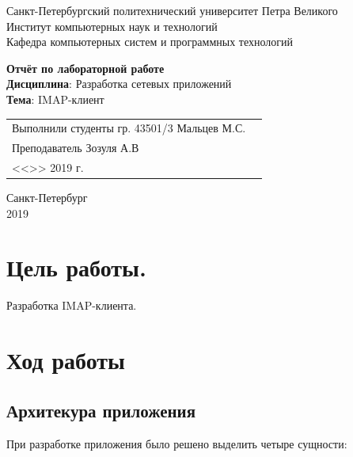 \documentclass[a4paper,14pt]{extarticle}
\begin{document}
\begin{titlepage}
\centering
Санкт-Петербургский политехнический университет Петра Великого \\
Институт компьютерных наук и технологий \\
Кафедра компьютерных систем и программных технологий \\
\vspace{5.5cm}

{\centering \textbf{Отчёт по лабораторной работе} \\ 
\vspace{0.15cm}
\textbf{Дисциплина}: Разработка сетевых приложений \\
\vspace{0.15cm}
\textbf{Тема}: IMAP-клиент } \\

\vspace{5.5cm}

\begin{table}[H]
\begin{tabular}{p{\textwidth}@{}r}
{Выполнили студенты гр. 43501/3} \hfill 
\vspace{0.2cm}
Мальцев М.С. \\ \hfill
\vspace{0.2cm}

Преподаватель \hfill 
\vspace{0.2cm}
Зозуля А.В \\ \hfill 
\vspace{0.2cm}

{} \hfill { <<\underline{\hspace{0.08\textwidth}}>> \underline{\hspace{0.2\textwidth}}2019 г.} \\
\end{tabular}
\end{table}
\vfill
{\centering Санкт-Петербург \\ 
\vspace{0.15cm}
2019}
\end{titlepage}

\section{Цель работы.}
Разработка IMAP-клиента.

\section{Ход работы}
\subsection{Архитекура приложения}
При разработке приложения было решено выделить четыре сущности:
\end{document}
